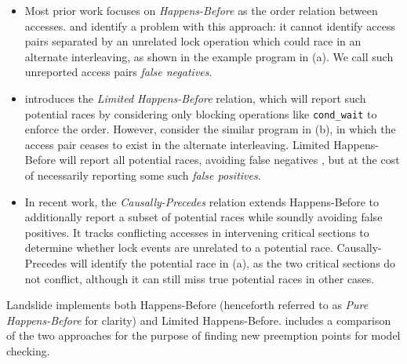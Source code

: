 \begin{itemize}
	\item Most prior work focuses on {\em Happens-Before} \cite{lamport-clocks} as the order relation between accesses.
\cite{predictive-dr} and \cite{hybriddatarace} identify a problem with this approach:
it cannot identify access pairs separated by an unrelated lock operation which could race in an alternate interleaving,
as shown in the example program in (a).
We call such unreported access pairs {\em false negatives}.

\item
\cite{hybriddatarace} introduces the {\em Limited Happens-Before} relation,
which will report such potential races
by considering only blocking operations like {\tt cond\_wait} to enforce the order.
However, consider the similar program in (b),
in which the access pair ceases to exist in the alternate interleaving.
Limited Happens-Before will report all potential races, avoiding false negatives \cite{tsan},
but at the cost of necessarily reporting some such {\em false positives}.

\item
In recent work, the {\em Causally-Precedes} relation \cite{predictive-dr} %
extends Happens-Before to additionally report a subset of potential races while soundly avoiding false positives.
It tracks conflicting accesses in intervening
critical sections to determine whether lock events are unrelated to a potential race.
Causally-Precedes will identify the potential race in (a), as the two critical sections do not conflict,
although it can still miss true potential races in other cases.
\end{itemize}

Landslide implements both Happens-Before (henceforth referred to as {\em Pure Happens-Before} for clarity) and Limited Happens-Before.
 includes a comparison of the two approaches for the purpose of finding new preemption points for model checking.



